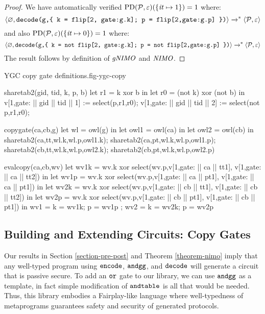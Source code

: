 \begin{proof}
  We have automatically verified $
  \mathrm{PD}(\mathcal{P},\varepsilon)(\{ \mathit{it} \mapsto 1 \}) = 1$ where:
  $$\langle \varnothing,\texttt{decode(g,\{ k = flip[2, gate:g.k]; p = flip[2,gate:g.p] \})} \rangle
    \xrightarrow{}^{*} \langle \mathcal{P},\varepsilon \rangle$$
    and also $
  \mathrm{PD}(\mathcal{P},\varepsilon)(\{ \mathit{it} \mapsto 0 \}) = 1$ where:
  $$\langle \varnothing,\texttt{decode(g,\{ k = not flip[2, gate:g.k]; p = not flip[2,gate:g.p] \})} \rangle
    \xrightarrow{}^{*} \langle \mathcal{P},\varepsilon \rangle$$
  The result follows by definition of $\mathit{gNIMO}$ and $\mathit{NIMO}$.
\end{proof}



\begin{fpfig}[t]{YGC copy gate definitions.}{fig-ygc-copy}
  {\footnotesize
    \begin{verbatimtab}
      sharetab2(gid, tid, k, p, b)
      {
        let r1 = k xor b in
        let r0 = (not k) xor (not b) in
        v[1,gate: || gid || tid || 1] := select(p,r1,r0);
        v[1,gate: || gid || tid || 2] := select(not p,r1,r0);
      }
      
      copygate(ca,cb,g)
      {
        let wl = owl(g) in
        let owl1 = owl(ca) in
        let owl2 = owl(cb) in
        sharetab2(ca,tt,wl.k,wl.p,owl1.k); sharetab2(ca,pt,wl.k,wl.p,owl1.p);
        sharetab2(cb,tt,wl.k,wl.p,owl2.k); sharetab2(cb,pt,wl.k,wl.p,owl2.p)
      }
      
      evalcopy(ca,cb,wv)
      {
        let wv1k = wv.k xor select(wv.p,v[1,gate: || ca || tt1], v[1,gate: || ca || tt2]) in
        let wv1p = wv.k xor select(wv.p,v[1,gate: || ca || pt1], v[1,gate: || ca || pt1]) in
        let wv2k = wv.k xor select(wv.p,v[1,gate: || cb || tt1], v[1,gate: || cb || tt2]) in
        let wv2p = wv.k xor select(wv.p,v[1,gate: || cb || pt1], v[1,gate: || cb || pt1]) in
        { wv1 = { k = wv1k; p = wv1p }; wv2 = { k = wv2k; p = wv2p } }  
      }  \end{verbatimtab}
  }
\end{fpfig}

\subsection{Building and Extending Circuits: Copy Gates}

Our results in Section \ref{section-pre-post} and Theorem
\ref{theorem-nimo} imply that any well-typed program using
$\texttt{encode}$, $\texttt{andgg}$, and $\texttt{decode}$ will generate a
circuit that is passive secure. To add an $\texttt{or}$ gate to our
library, we can use $\texttt{andgg}$ as a template, in fact simple
modification of $\texttt{andtable}$ is all that would be needed. Thus,
this library embodies a Fairplay-like language where well-typedness
of metaprograms guarantees safety and security of generated protocols.

